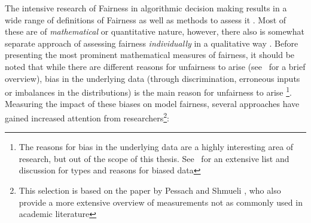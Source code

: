 The intensive research of Fairness in algorithmic decision making results in a wide range of definitions of Fairness as well as methods to assess it \parencite{CorbettDavies2023}.
Most of these are of \textit{mathematical} or quantitative nature, however, there also is somewhat separate approach of assessing fairness \textit{individually} in a qualitative way \parencite{Chouldechova2018}.
Before presenting the most prominent mathematical measures of fairness, it should be noted that while there are different reasons for unfairness to arise (see~\cite{Chouldechova2018} for a brief overview), bias in the underlying data (through discrimination, erroneous inputs or imbalances in the distributions) 
is the main reason for unfairness to arise \parencite{Choras2020}\footnote{The reasons for bias in the underlying data are a highly interesting area of research, but out of the scope of this thesis. See~\cite{Mehrabi2021} for an extensive list and discussion for types and reasons for biased data}.
Measuring the impact of these biases on model fairness, several approaches have gained increased attention from researchers\footnote{This selection is based on the paper by Pessach and Shmueli \parencite{Pessach2020}, who also provide a more extensive overview of measurements not as commonly used in academic literature}:
